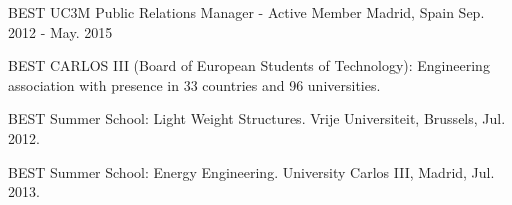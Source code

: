 

\begin{cventries}

  \cventry
    {BEST UC3M} %
    {Public Relations Manager - Active Member} %
    {Madrid, Spain} %
    {Sep. 2012 - May. 2015} %
    {
      \begin{cvitems} %
        \item {BEST CARLOS III (Board of European Students of Technology): Engineering association with presence in 33 countries and 96 universities.}
        \item {BEST Summer School: Light Weight Structures. Vrije Universiteit, Brussels, Jul. 2012.}
        \item {BEST Summer School: Energy Engineering. University Carlos III, Madrid, Jul. 2013.}
      \end{cvitems}
    }

\end{cventries}
